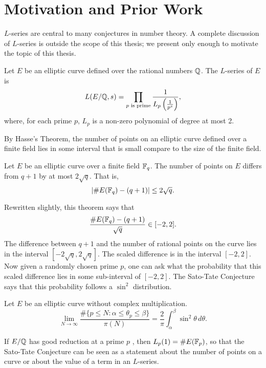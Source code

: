 

\section{Motivation and Prior Work}

$L$-series are central to many conjectures in number theory.
A complete discussion of $L$-series is outside the scope of this thesis;
we present only enough to motivate the topic of this thesis.

Let $E$ be an elliptic curve defined over the rational numbers $\mathbb{Q}$.
The $L$-series of $E$ is
\[ L(E/\mathbb{Q}, s)  = \prod_{p \text{ is prime}} \frac 1 {L_p \left( \frac 1 {p^s} \right)},\]
where, for each prime $p$, $L_p$ is a non-zero polynomial of degree at most 2.

By Hasse's Theorem, the number of points on an elliptic curve defined over a finite field
lies in some interval that is small compare to the size of the finite field.
\begin{theorem}[Hasse]
  Let $E$ be an elliptic curve over a finite field $\mathbb{F}_q$.
  The number of points on $E$ differs from $q + 1$ by at most $2 \sqrt q$.
  That is,
  \[ | \#E(\mathbb{F}_q) - (q + 1) | \leq 2 \sqrt q. \]
\end{theorem}

Rewritten slightly, this theorem says that
  \[ \frac {\#E(\mathbb{F}_q) - (q + 1)} {\sqrt q} \in [-2, 2]. \]
The difference between $q + 1$ and the number of rational points on the curve
lies in the interval $[-2 \sqrt q, 2 \sqrt q]$.
The scaled difference is in the interval $[-2, 2]$.
Now given a randomly chosen prime $p$,
one can ask what the probability that this scaled difference lies in some sub-interval of $[-2, 2]$.
The Sato-Tate Conjecture says that this probability follows a $\sin^2$ distribution.
\begin{conjecture}
  Let $E$ be an elliptic curve without complex multiplication.
  \[ \lim_{N \to \infty}
    \frac {\#\{ p \leq N : \alpha \leq \theta_p \leq \beta \}} {\pi(N)} =
    \frac 2 \pi \int_{\alpha}^{\beta} \sin^2 \theta\,d\theta. \]
\end{conjecture}

If $E/\mathbb{Q}$ has good reduction at a prime $p$
,
then $L_p(1) = \#E(\mathbb{F}_p)$,
so that the Sato-Tate Conjecture can be seen as a statement about the number of points on a curve
or about the value of a term in an $L$-series.

